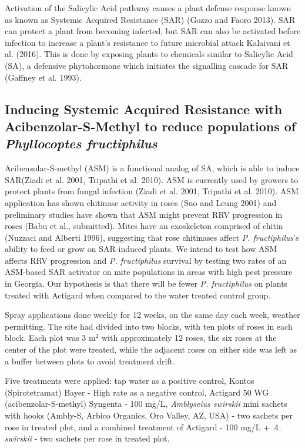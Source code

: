 \documentclass[12pt,final,CPage]{ufthesis}
\begin{document}
{  Activation of the Salicylic Acid pathway causes a plant defense response known as known as Systemic Acquired Resistance (SAR) (Gozzo and Faoro 2013). SAR can protect a plant from becoming infected, but SAR can also be activated before infection to increase a plant's resistance to future microbial attack Kalaivani et al. (2016). This is done by exposing plants to chemicals similar to Salicylic Acid (SA), a defensive phytohormone which initiates the signalling cascade for SAR (Gaffney et al. 1993).

  \hypertarget{ipm-actigard}{%
  \subsection{\texorpdfstring{Inducing Systemic Acquired Resistance with Acibenzolar-S-Methyl to reduce populations of \emph{Phyllocoptes fructiphilus}}{Inducing Systemic Acquired Resistance with Acibenzolar-S-Methyl to reduce populations of Phyllocoptes fructiphilus}}\label{ipm-actigard}}

  Acibenzolar-S-methyl (ASM) is a functional analog of SA, which is able to induce SAR(Ziadi et al. 2001, Tripathi et al. 2010). ASM is currently used by growers to protect plants from fungal infection (Ziadi et al. 2001, Tripathi et al. 2010). ASM application has shown chitinase activity in roses (Suo and Leung 2001) and preliminary studies have shown that ASM might prevent RRV progression in roses (Babu et al., submitted). Mites have an exoskeleton comprised of chitin (Nuzzaci and Alberti 1996), suggesting that rose chitinases affect \emph{P. fructiphilus}'s ability to feed or grow on SAR-induced plants. We intend to test how ASM affects RRV progression and \emph{P. fructiphilus} survival by testing two rates of an ASM-based SAR activator on mite populations in areas with high pest pressure in Georgia. Our hypothesis is that there will be fewer \emph{P. fructiphilus} on plants treated with Actigard when compared to the water treated control group.

  Spray applications done weekly for 12 weeks, on the same day each week, weather permitting.
  The site had divided into two blocks, with ten plots of roses in each block. Each plot was 3 \si{m}\(^2\) with approximately 12 roses, the six roses at the center of the plot were treated, while the adjacent roses on either side was left as a buffer between plots to avoid treatment drift.

  Five treatments were applied: tap water as a positive control, Kontos (Spirotetramat) Bayer - High rate as a negative control, Actigard 50 WG (acibenzolar-S-methyl) Syngenta - 100 \si{\milli\gram}/\si{\liter}, \emph{Amblyseius swirskii} mini sachets with hooks (Ambly-S, Arbico Organics, Oro Valley, AZ, USA) - two sachets per rose in treated plot, and a combined treatment of Actigard - 100 \si{\milli\gram}/\si{\liter} + \emph{A. swirskii} - two sachets per rose in treated plot.

}
\end{document}
